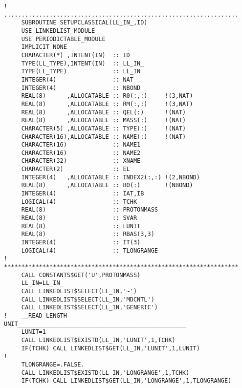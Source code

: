 \documentclass[11pt,a4paper]{report}
\begin{document}
\begin{verbatim}
!    ...................................................................
     SUBROUTINE SETUPCLASSICAL(LL_IN_,ID)
     USE LINKEDLIST_MODULE
     USE PERIODICTABLE_MODULE
     IMPLICIT NONE
     CHARACTER(*) ,INTENT(IN)  :: ID
     TYPE(LL_TYPE),INTENT(IN)  :: LL_IN_
     TYPE(LL_TYPE)             :: LL_IN
     INTEGER(4)                :: NAT
     INTEGER(4)                :: NBOND
     REAL(8)      ,ALLOCATABLE :: R0(:,:)     !(3,NAT)
     REAL(8)      ,ALLOCATABLE :: RM(:,:)     !(3,NAT)
     REAL(8)      ,ALLOCATABLE :: QEL(:)      !(NAT)
     REAL(8)      ,ALLOCATABLE :: MASS(:)     !(NAT)
     CHARACTER(5) ,ALLOCATABLE :: TYPE(:)     !(NAT)
     CHARACTER(16),ALLOCATABLE :: NAME(:)     !(NAT)
     CHARACTER(16)             :: NAME1
     CHARACTER(16)             :: NAME2
     CHARACTER(32)             :: XNAME
     CHARACTER(2)              :: EL
     INTEGER(4)   ,ALLOCATABLE :: INDEX2(:,:) !(2,NBOND)
     REAL(8)      ,ALLOCATABLE :: BO(:)       !(NBOND)
     INTEGER(4)                :: IAT,IB
     LOGICAL(4)                :: TCHK
     REAL(8)                   :: PROTONMASS
     REAL(8)                   :: SVAR
     REAL(8)                   :: LUNIT
     REAL(8)                   :: RBAS(3,3)
     INTEGER(4)                :: IT(3)
     LOGICAL(4)                :: TLONGRANGE
!    *******************************************************************
     CALL CONSTANTS$GET('U',PROTONMASS)
     LL_IN=LL_IN_
     CALL LINKEDLIST$SELECT(LL_IN,'~')
     CALL LINKEDLIST$SELECT(LL_IN,'MDCNTL')
     CALL LINKEDLIST$SELECT(LL_IN,'GENERIC')
!    __READ LENGTH UNIT________________________________________________
     LUNIT=1
     CALL LINKEDLIST$EXISTD(LL_IN,'LUNIT',1,TCHK)
     IF(TCHK) CALL LINKEDLIST$GET(LL_IN,'LUNIT',1,LUNIT)
!
     TLONGRANGE=.FALSE.
     CALL LINKEDLIST$EXISTD(LL_IN,'LONGRANGE',1,TCHK)
     IF(TCHK) CALL LINKEDLIST$GET(LL_IN,'LONGRANGE',1,TLONGRANGE)


\end{verbatim}
\end{document}
